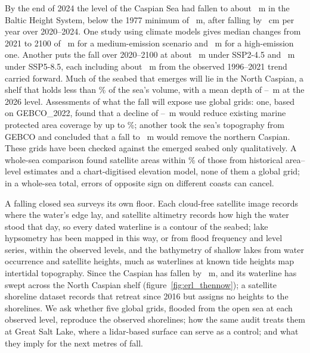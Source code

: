 By the end of 2024 the level of the Caspian Sea had fallen to about ~m in the Baltic Height System, below the 1977 minimum of ~m, after falling by ~cm per year over 2020--2024\citep{ginzburg2025}. One study using  climate models gives median changes from 2021 to 2100 of ~m for a medium-emission scenario and ~m for a high-emission one\citep{hoseini2025}. Another puts the fall over 2020--2100 at about ~m under SSP2-4.5 and ~m under SSP5-8.5, each including about ~m from the observed 1996--2021 trend carried forward\citep{samant2023}. Much of the seabed that emerges will lie in the North Caspian, a shelf that holds less than \% of the sea's volume\citep{akbari2020}, with a mean depth of --~m at the 2026 level. Assessments of what the fall will expose use global grids: one, based on GEBCO\_2022, found that a decline of --~m would reduce existing marine protected area coverage by up to \%\citep{court2025}; another took the sea's topography from GEBCO and concluded that a fall to ~m would remove the northern Caspian\citep{duan2025}. These grids have been checked against the emerged seabed only qualitatively\citep{akbari2020}. A whole-sea comparison found satellite areas within \% of those from historical area--level estimates and a chart-digitised elevation model, none of them a global grid\citep{bocharov2026}; in a whole-sea total, errors of opposite sign on different coasts can cancel.

A falling closed sea surveys its own floor. Each cloud-free satellite image records where the water's edge lay, and satellite altimetry records how high the water stood that day, so every dated waterline is a contour of the seabed\citep{schroder2022,li2022,schwatke2020}; lake hypsometry has been mapped in this way, or from flood frequency and level series, within the observed levels\citep{cretaux2016,busker2019,fassoniandrade2020}, and the bathymetry of shallow lakes from water occurrence and satellite heights\citep{armon2020}, much as waterlines at known tide heights map intertidal topography\citep{sagar2017,bishoptaylor2019}. Since  the Caspian has fallen by ~m, and its waterline has swept across the North Caspian shelf (figure~\ref{fig:erl_thennow}); a satellite shoreline dataset records that retreat since 2016 but assigns no heights to the shorelines\citep{dedova2026a}. We ask whether five global grids, flooded from the open sea at each observed level, reproduce the observed shorelines; how the same audit treats them at Great Salt Lake, where a lidar-based surface can serve as a control; and what they imply for the next metres of fall.
